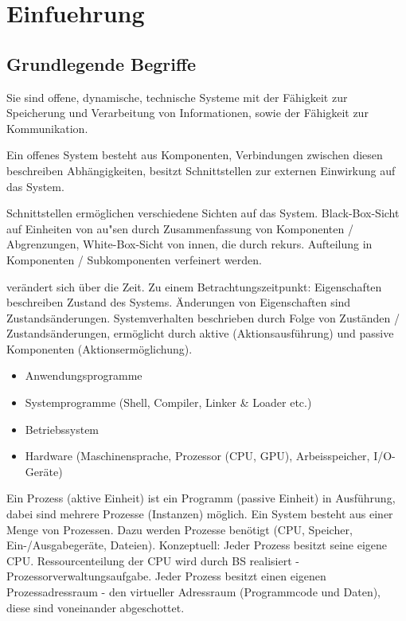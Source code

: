 \section{Einfuehrung}

\subsection{Grundlegende Begriffe}
Sie sind offene, dynamische, technische Systeme mit der Fähigkeit zur Speicherung und Verarbeitung von Informationen, sowie der Fähigkeit zur Kommunikation.

Ein offenes System besteht aus Komponenten, Verbindungen zwischen diesen beschreiben Abhängigkeiten, besitzt Schnittstellen zur externen Einwirkung auf das System. 

Schnittstellen ermöglichen verschiedene Sichten auf das System. Black-Box-Sicht auf Einheiten von au"sen durch Zusammenfassung von Komponenten / Abgrenzungen, White-Box-Sicht von innen, die durch rekurs. Aufteilung in Komponenten / Subkomponenten verfeinert werden.
 
 verändert sich über die Zeit. Zu einem Betrachtungszeitpunkt: Eigenschaften beschreiben Zustand des Systems. Änderungen von Eigenschaften sind Zustands\-änderungen. System\-verhalten beschrieben durch Folge von Zuständen / Zustandsänderungen, ermöglicht durch aktive (Aktionsausführung) und passive Komponenten (Aktionsermöglichung).  

\begin{itemize} 	\setlength\itemsep{0em}
	\item Anwendungsprogramme
	\item Systemprogramme (Shell, Compiler, Linker \& Loader etc.)
	\item Betriebssystem
	\item Hardware (Maschinensprache, Prozessor (CPU, GPU), Arbeisspeicher, I/O-Geräte)
\end{itemize}

Ein Prozess (aktive Einheit) ist ein Programm (passive Einheit) in Ausführung, dabei sind mehrere Prozesse (Instanzen) möglich. Ein System besteht aus einer Menge von Prozessen. Dazu werden Prozesse benötigt (CPU, Speicher, Ein-/Ausgabegeräte, Dateien). Konzeptuell: Jeder Prozess besitzt seine eigene CPU. Ressourcenteilung der CPU wird durch BS realisiert - Prozessorverwaltungsaufgabe. Jeder Prozess besitzt einen eigenen Prozessadressraum - den virtueller Adressraum (Programmcode und Daten), diese sind voneinander abgeschottet.  

